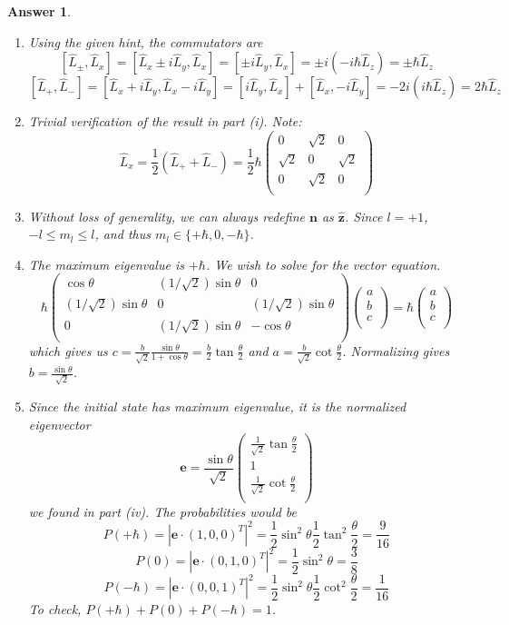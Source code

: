 \documentclass[a4paper]{article}
\newtheorem{ans}{Answer}[subsection]
\theoremstyle{new}
\begin{document}
\begin{ans}\leavevmode
\begin{enumerate}[label=(\roman*)]
\item Using the given hint, the commutators are
$$[\hat{L}_\pm,\hat{L}_x]=[\hat{L}_x\pm i\hat{L}_y,\hat{L}_x]=[\pm i\hat{L}_y,\hat{L}_x]=\pm i(-i\hbar\hat{L}_z)=\pm \hbar\hat{L}_z$$
$$[\hat{L}_+,\hat{L}_-]=[\hat{L}_x+i\hat{L}_y,\hat{L}_x-i\hat{L}_y]=[i\hat{L}_y,\hat{L}_x]+[\hat{L}_x,-i\hat{L}_y]=-2i(i\hbar\hat{L}_z)=2\hbar\hat{L}_z$$
\item Trivial verification of the result in part (i). Note:
$$\hat{L}_x=\frac{1}{2}(\hat{L}_++\hat{L}_-)=\frac{1}{2}\hbar\begin{pmatrix}0&\sqrt{2}&0\\\sqrt{2}&0&\sqrt{2}\\0&\sqrt{2}&0\\\end{pmatrix}$$
\item Without loss of generality, we can always redefine $\mathbf{n}$ as $\mathbf{\hat{z}}$. Since $l=+1$, $-l\leq m_l\leq l$, and thus $m_l\in\{+\hbar,0,-\hbar\}$.
\item The maximum eigenvalue is $+\hbar$. We wish to solve for the vector equation.
$$\hbar\begin{pmatrix}\cos\theta&(1/\sqrt{2})\sin\theta&0\\(1/\sqrt{2})\sin\theta&0&(1/\sqrt{2})\sin\theta\\0&(1/\sqrt{2})\sin\theta&-\cos\theta\\\end{pmatrix}\begin{pmatrix}a\\b\\c\\\end{pmatrix}=\hbar\begin{pmatrix}a\\b\\c\\\end{pmatrix}$$
which gives us $c=\frac{b}{\sqrt{2}}\frac{\sin\theta}{1+\cos\theta}=\frac{b}{2}\tan\frac{\theta}{2}$ and $a=\frac{b}{\sqrt{2}}\cot\frac{\theta}{2}$. Normalizing gives $b=\frac{\sin\theta}{\sqrt{2}}$.
\item Since the initial state has maximum eigenvalue, it is the normalized eigenvector $$\mathbf{e}=\frac{\sin\theta}{\sqrt{2}}\begin{pmatrix}\frac{1}{\sqrt{2}}\tan\frac{\theta}{2}\\1\\\frac{1}{\sqrt{2}}\cot\frac{\theta}{2}\\\end{pmatrix}$$ 
we found in part (iv). The probabilities would be
$$P(+\hbar)=|\mathbf{e}\cdot(1,0,0)^T|^2=\frac{1}{2}\sin^2\theta\frac{1}{2}\tan^2\frac{\theta}{2}=\frac{9}{16}$$
$$P(0)=|\mathbf{e}\cdot(0,1,0)^T|^2=\frac{1}{2}\sin^2\theta=\frac{3}{8}$$
$$P(-\hbar)=|\mathbf{e}\cdot(0,0,1)^T|^2=\frac{1}{2}\sin^2\theta\frac{1}{2}\cot^2\frac{\theta}{2}=\frac{1}{16}$$
To check, $P(+\hbar)+P(0)+P(-\hbar)=1$.
\end{enumerate}
\end{ans}
\end{document}
